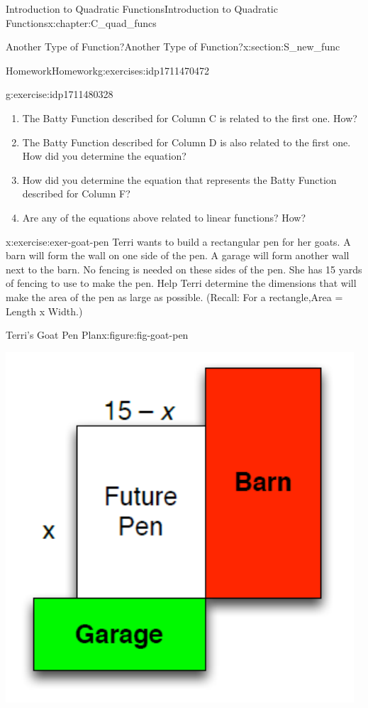 \documentclass[oneside,10pt,]{book}
\numberwithin{equation}{chapter}
\begin{document}
\begin{chapterptx}{Introduction to Quadratic Functions}{}{Introduction to Quadratic Functions}{}{}{x:chapter:C_quad_funcs}
\begin{sectionptx}{Another Type of Function?}{}{Another Type of Function?}{}{}{x:section:S_new_func}
\begin{exercises-subsection}{Homework}{}{Homework}{}{}{g:exercises:idp1711470472}
\begin{divisionexercise}{4}{}{}{g:exercise:idp1711480328}
\begin{enumerate}[font=\bfseries,label=(\alph*),ref=\alph*]
\item{}The Batty Function described for Column C is related to the first one. How?%
\item{}The Batty Function described for Column D is also related to the first one. How did you determine the equation?%
\item{}How did you determine the equation that represents the Batty Function described for Column F?%
\item{}Are any of the equations above related to linear functions? How?%
\end{enumerate}
\end{divisionexercise}%
\begin{divisionexercise}{5}{}{}{x:exercise:exer-goat-pen}%
Terri wants to build a rectangular pen for her goats. A barn will form the wall on one side of the pen. A garage will form another wall next to the barn. No fencing is needed on these sides of the pen. She has 15 yards of fencing to use to make the pen. Help Terri determine the dimensions that will make the area of the pen as large as possible. (Recall: For a rectangle,Area = Length x Width.)%
\begin{figureptx}{Terri's Goat Pen Plan}{x:figure:fig-goat-pen}{}%
\begin{image}{0.3}{0.4}{0.3}%
\includegraphics[width=\linewidth]{external/goat-pen.pdf}

\end{image}
\end{figureptx}
\end{divisionexercise}
\end{exercises-subsection}
\end{sectionptx}
\end{chapterptx}
\end{document}
